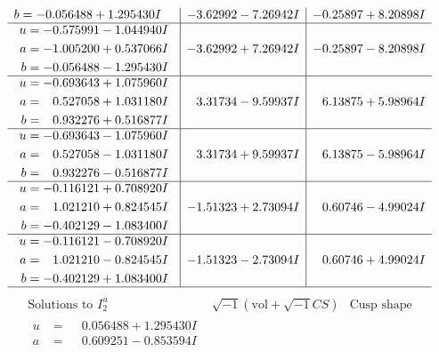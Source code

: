 \documentclass[1p]{elsarticle_modified}
\theoremstyle{definition}
\newcommand{\I}{\sqrt{-1}}
\begin{document}
$$\begin{array}{c|c|c}
\begin{aligned}
b &= -0.056488 + 1.295430 I\end{aligned}
 & -3.62992 - 7.26942 I & -0.25897 + 8.20898 I \\ \hline\begin{aligned}
u &= -0.575991 - 1.044940 I \\
a &= -1.005200 + 0.537066 I \\
b &= -0.056488 - 1.295430 I\end{aligned}
 & -3.62992 + 7.26942 I & -0.25897 - 8.20898 I \\ \hline\begin{aligned}
u &= -0.693643 + 1.075960 I \\
a &= \phantom{-}0.527058 + 1.031180 I \\
b &= \phantom{-}0.932276 + 0.516877 I\end{aligned}
 & \phantom{-}3.31734 - 9.59937 I & \phantom{-}6.13875 + 5.98964 I \\ \hline\begin{aligned}
u &= -0.693643 - 1.075960 I \\
a &= \phantom{-}0.527058 - 1.031180 I \\
b &= \phantom{-}0.932276 - 0.516877 I\end{aligned}
 & \phantom{-}3.31734 + 9.59937 I & \phantom{-}6.13875 - 5.98964 I \\ \hline\begin{aligned}
u &= -0.116121 + 0.708920 I \\
a &= \phantom{-}1.021210 + 0.824545 I \\
b &= -0.402129 - 1.083400 I\end{aligned}
 & -1.51323 + 2.73094 I & \phantom{-}0.60746 - 4.99024 I \\ \hline\begin{aligned}
u &= -0.116121 - 0.708920 I \\
a &= \phantom{-}1.021210 - 0.824545 I \\
b &= -0.402129 + 1.083400 I\end{aligned}
 & -1.51323 - 2.73094 I & \phantom{-}0.60746 + 4.99024 I\\
 \hline 
 \end{array}$$\newpage$$\begin{array}{c|c|c}  
\text{Solutions to }I^u_{2}& \I (\text{vol} + \sqrt{-1}CS) & \text{Cusp shape}\\
 \hline 
\begin{aligned}
u &= \phantom{-}0.056488 + 1.295430 I \\
a &= \phantom{-}0.609251 - 0.853594 I \\

\end{aligned}
\end{array}$$
\end{document}
